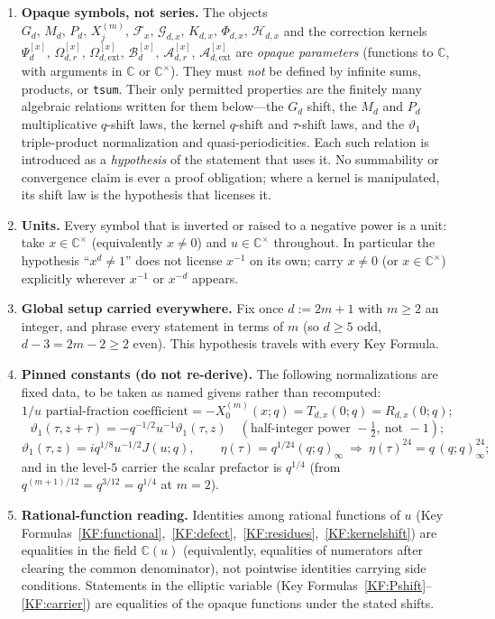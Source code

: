\documentclass[11pt]{article}
\newcommand{\C}{\mathbb{C}}
\newcommand{\GG}{\mathcal{G}}
\newcommand{\FF}{\mathcal{F}}
\theoremstyle{definition}
\begin{document}
\begin{enumerate}
\item[(C1)] \textbf{Opaque symbols, not series.} The objects
$G_d,\,M_d,\,P_d,\,X_j^{(m)},\,\FF_x,\,\GG_{d,x},\,K_{d,x},\,\Phi_{d,x},\,\mathcal H_{d,x}$
and the correction kernels
$\Psi_d^{[x]},\,\Omega_{d,r}^{[x]},\,\Omega_{d,\mathrm{ext}}^{[x]},\,
\mathcal B_d^{[x]},\,\mathcal A_{d,r}^{[x]},\,\mathcal A_{d,\mathrm{ext}}^{[x]}$
are \emph{opaque parameters} (functions to $\C$, with arguments in $\C$ or $\C^\times$).
They must \emph{not} be defined by infinite sums, products, or \texttt{tsum}. Their only
permitted properties are the finitely many algebraic relations written for them below---the
$G_d$ shift, the $M_d$ and $P_d$ multiplicative $q$-shift laws, the kernel $q$-shift and
$\tau$-shift laws, and the $\vartheta_1$ triple-product normalization and quasi-periodicities.
Each such relation is introduced as a \emph{hypothesis} of the statement that uses it. No
summability or convergence claim is ever a proof obligation; where a kernel is manipulated,
its shift law is the hypothesis that licenses it.

\item[(C2)] \textbf{Units.} Every symbol that is inverted or raised to a negative power is a
unit: take $x\in\C^\times$ (equivalently $x\ne0$) and $u\in\C^\times$ throughout. In
particular the hypothesis ``$x^d\ne1$'' does not license $x^{-1}$ on its own; carry $x\ne0$
(or $x\in\C^\times$) explicitly wherever $x^{-1}$ or $x^{-d}$ appears.

\item[(C3)] \textbf{Global setup carried everywhere.} Fix once $d:=2m+1$ with $m\ge2$ an
integer, and phrase every statement in terms of $m$ (so $d\ge5$ odd, $d-3=2m-2\ge2$ even).
This hypothesis travels with every Key Formula.

\item[(C4)] \textbf{Pinned constants (do not re-derive).} The following normalizations are
fixed data, to be taken as named givens rather than recomputed:
\[
\text{$1/u$ partial-fraction coefficient}=-X_0^{(m)}(x;q)=T_{d,x}(0;q)=R_{d,x}(0;q);
\]
\[
\vartheta_1(\tau,z+\tau)=-q^{-1/2}u^{-1}\vartheta_1(\tau,z)
\quad(\text{half-integer power }-\tfrac12,\ \text{not }-1);
\]
\[
\vartheta_1(\tau,z)=iq^{1/8}u^{-1/2}J(u;q),
\qquad
\eta(\tau)=q^{1/24}(q;q)_\infty
\ \Rightarrow\ \eta(\tau)^{24}=q\,(q;q)_\infty^{24};
\]
and in the level-$5$ carrier the scalar prefactor is $q^{1/4}$ (from
$q^{(m+1)/12}=q^{3/12}=q^{1/4}$ at $m=2$).

\item[(C5)] \textbf{Rational-function reading.} Identities among rational functions of $u$
(Key Formulas~\ref{KF:functional},~\ref{KF:defect},~\ref{KF:residues},~\ref{KF:kernelshift})
are equalities in the field $\C(u)$ (equivalently, equalities of numerators after clearing
the common denominator), not pointwise identities carrying side conditions. Statements in the
elliptic variable (Key Formulas~\ref{KF:Pshift}--\ref{KF:carrier}) are equalities of the
opaque functions under the stated shifts.


\end{enumerate}
\end{document}
